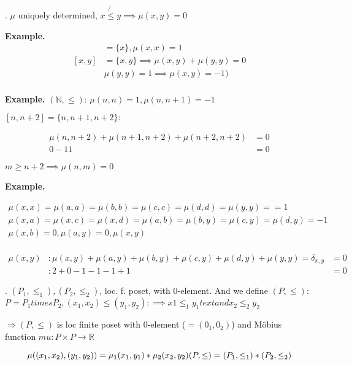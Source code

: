 \Remark.
$\mu$ uniquely determined, $x \not{\leq} y \implies \mu(x,y) = 0$

\textbf{Example.}
\begin{align*}
  [x,x] & = \{x\}, \mu(x,x) = 1 \\
  [x,y] &= \{x,y\} \implies \mu(x,y) + \mu(y,y) = 0 \\
        &           \mu(y,y) = 1 \implies \mu(x,y) = -1) \\
\end{align*}

\textbf{Example.}
$(\mathbb{N}, \leq)$: $\mu(n,n) = 1, \mu(n,n+1) = -1$

$[n,n+2] = \{n,n+1, n+2\}:$

\begin{align*}
    \mu(n,n+2) + \mu(n+1,n+2) + \mu(n+2, n+2) &= 0 \\
    0 -1 1 &= 0
\end{align*}

$ m \geq n+2 \implies \mu(n,m) = 0$

\textbf{Example.}

\begin{gather*}
    \mu(x,x) = \mu(a,a) = \mu(b,b) = \mu(c,c) = \mu(d,d) = \mu(y,y) =  = 1\\
    \mu(x,a) = \mu(x,c) = \mu(x,d) = \mu(a,b) = \mu(b,y) = \mu(c,y) = \mu(d,y) = -1\\
    \mu(x,b) = 0, \mu(a,y) = 0, \mu(x,y) \\
\end{gather*}

\begin{align*}
    \mu(x,y)&: \mu(x,y) + \mu(a,y) + \mu(b,y) + \mu(c,y) + \mu(d,y) + \mu(y,y) = \delta_{x,y} &= 0 \\
        &: 2 +0 -1 -1 -1 +1 &= 0
\end{align*}


\Theorem.
$(P_1, \leq_1), (P_2, \leq_2)$, loc. f. poset, with 0-element. 
And we define $(P, \leq):$ $P = P_1 times P_2, (x_1,x_2) \leq (y_1, y_2) :\implies x1 \leq_1 y_1 text{ and } x_2 \leq_2 y_2$

$\Rightarrow (P, \leq)$ is loc finite poset with 0-element ($=(0_1, 0_2)$) and Möbius function $mu: P\times P \rightarrow \mathbb{R}$

\[
    \mu ( (x_1, x_2), (y_1,y_2)) = \mu_1(x_1,y_1) * \mu_2(x_2,y_2) \\
    (P, \leq) = (P_1, \leq_1) * (P_2, \leq_2)
\]

